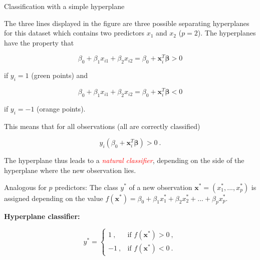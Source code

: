 \documentclass[10pt,ignorenonframetext,]{beamer}
\begin{document}
\begin{frame}

\begin{block}{Classification with a simple hyperplane}

\vspace{2mm}

The three lines displayed in the figure are three possible separating
hyperplanes for this dataset which contains two predictors \(x_1\) and
\(x_2\) (\(p=2\)). The hyperplanes have the property that

\[\beta_0+\beta_1 x_{i1} + \beta_2 x_{i2} =\beta_0+{\boldsymbol x}_i^T {\boldsymbol \beta}>0\]

if \(y_i=1\) (green points) and

\[\beta_0+\beta_1 x_{i1} + \beta_2 x_{i2} =\beta_0+{\boldsymbol x}_i^T {\boldsymbol \beta}<0\]

if \(y_i=-1\) (orange points).

\end{block}

\end{frame}

\begin{frame}

This means that for all observations (all are correctly classified)

\[y_i (\beta_0+{\boldsymbol x}_i^T {\boldsymbol \beta})>0 \ .\]

\vspace{2mm}

The hyperplane thus leads to a
\emph{\textcolor{red}{natural classifier}}, depending on the side of the
hyperplane where the new observation lies.

Analogous for \(p\) predictors: The class \(y^*\) of a new observation
\({\boldsymbol x}^*=(x_1^*,...,x_p^*)\) is assigned depending on the
value
\(f({\boldsymbol x}^*)=\beta_0+\beta_1 x_1^* + \beta_2 x_{2}^*+...+\beta_p x_{p}^*.\)

\vspace{2mm}

\textbf{Hyperplane classifier:}

\[y^* = \left\{ \begin{array}{ll}
1 \ , & \text{if } f({\boldsymbol x}^*) >0 \ ,\\
-1 \ , & \text{if } f({\boldsymbol x}^*) < 0 \ .
\end{array}\right.\]

\end{frame}
\end{document}
